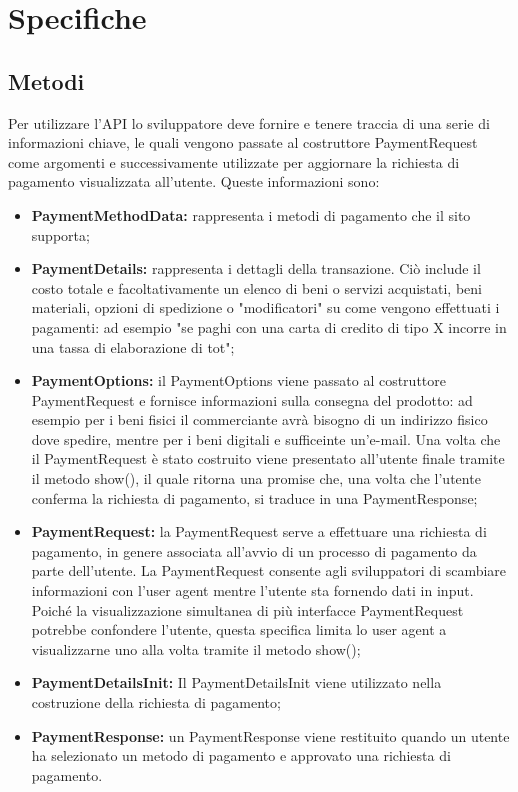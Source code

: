 \documentclass[italian]{article}
\begin{document}
	\section{Specifiche}
	\subsection{Metodi}
	Per utilizzare l'API lo sviluppatore deve fornire e tenere traccia di una serie di informazioni chiave, le quali vengono passate al costruttore PaymentRequest come argomenti e successivamente utilizzate per aggiornare la richiesta di pagamento visualizzata all'utente. Queste informazioni sono:
	\begin{itemize}
	\item \textbf{PaymentMethodData:} rappresenta i metodi di pagamento che il sito supporta;
	\item \textbf{PaymentDetails:} rappresenta i dettagli della transazione. Ciò include il costo totale e facoltativamente un elenco di beni o servizi acquistati, beni materiali, opzioni di spedizione o "modificatori" su come vengono effettuati i pagamenti: ad esempio "se paghi con una carta di credito di tipo X incorre in una tassa di elaborazione di tot";
	\item \textbf{PaymentOptions:} il PaymentOptions viene passato al costruttore PaymentRequest e fornisce informazioni sulla consegna del prodotto: ad esempio per i beni fisici il commerciante avrà bisogno di un indirizzo fisico dove spedire, mentre per i beni digitali e sufficeinte un'e-mail. Una volta che il PaymentRequest è stato costruito viene presentato all'utente finale tramite il metodo show(), il quale ritorna una promise che, una volta che l'utente conferma la richiesta di pagamento, si traduce in una PaymentResponse;
	\item \textbf{PaymentRequest:} la PaymentRequest serve a effettuare una richiesta di pagamento, in genere associata all'avvio di un processo di pagamento da parte dell'utente. La PaymentRequest consente agli sviluppatori di scambiare informazioni con l'user agent mentre l'utente sta fornendo dati in input. Poiché la visualizzazione simultanea di più interfacce PaymentRequest potrebbe confondere l'utente, questa specifica limita lo user agent a visualizzarne uno alla volta tramite il metodo show();
	\item \textbf{PaymentDetailsInit:} Il PaymentDetailsInit viene utilizzato nella costruzione della richiesta di pagamento;
	\item \textbf{PaymentResponse:} un PaymentResponse viene restituito quando un utente ha selezionato un metodo di pagamento e approvato una richiesta di pagamento.
	\end{itemize}
\end{document}
